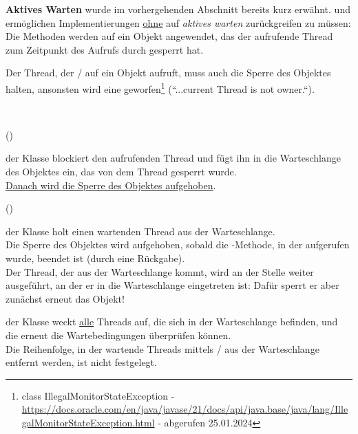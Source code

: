 \noindent
\textbf{Aktives Warten} wurde im vorhergehenden Abschnitt bereits kurz erwähnt.
 und  ermöglichen Implementierungen \ul{ohne} auf \textit{aktives warten} zurückgreifen zu müssen: Die Methoden werden auf ein Objekt angewendet, das der aufrufende Thread zum Zeitpunkt des Aufrufs durch  gesperrt hat.

\begin{tcolorbox}[enlarge top by=0.5cm,enlarge bottom by=0.5cm]
    Der Thread, der  /  auf ein Objekt aufruft, muss auch die Sperre des Objektes halten, ansonsten wird eine  geworfen\footnote{
    class IllegalMonitorStateException - \url{https://docs.oracle.com/en/java/javase/21/docs/api/java.base/java/lang/IllegalMonitorStateException.html} - abgerufen 25.01.2024
    } (``...current Thread is not owner.``).
\end{tcolorbox}\\

\begin{center}
 ()
\end{center}
\noindent
der Klasse  blockiert den aufrufenden Thread und fügt ihn in die Warteschlange des Objektes ein, das von dem Thread gesperrt wurde.\\
\ul{Danach wird die Sperre des Objektes aufgehoben}.

\begin{center}
     ()
\end{center}
\noindent
der Klasse  holt einen wartenden Thread aus der Warteschlange.\\
Die Sperre des Objektes wird aufgehoben, sobald die -Methode, in der  aufgerufen wurde, beendet ist (durch eine Rückgabe).\\
Der Thread, der aus der Warteschlange kommt, wird an der Stelle weiter ausgeführt, an der er in die Warteschlange eingetreten ist: Dafür sperrt er aber zunächst erneut das Objekt!

\begin{center}
\end{center}
\noindent
der Klasse  weckt \ul{alle} Threads auf, die sich in der Warteschlange befinden, und die erneut die Wartebedingungen überprüfen können.\\
Die Reihenfolge, in der wartende Threads mittels / aus der Warteschlange entfernt werden, ist nicht festgelegt.

